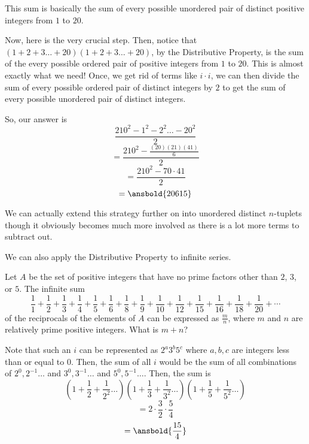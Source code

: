 \documentclass[11pt][mast]{lucky}
\begin{document}
\begin{sol}
This sum is basically the sum of every possible unordered pair of distinct positive integers from $1$ to $20$.

Now, here is the very crucial step. Then, notice that $(1+2+3\ldots + 20)(1+2+3\ldots + 20)$, by the Distributive Property, is the sum of the every possible ordered pair of positive integers from $1$ to $20$. This is almost exactly what we need! Once, we get rid of terms like $i\cdot i$, we can then divide the sum of every possible ordered pair of distinct integers by $2$ to get the sum of every possible unordered pair of distinct integers.

So, our answer is
$$\frac{210^2-1^2-2^2\ldots - 20^2}{2}$$
$$=\frac{210^2-\frac{(20)(21)(41)}{6}}{2}$$
$$=\frac{210^2-70\cdot 41}{2}$$
$$=\ansbold{20615}$$
\end{sol}

We can actually extend this strategy further on into unordered distinct $n$-tuplets though it obviously becomes much more involved as there is a lot more terms to subtract out.

We can also apply the Distributive Property to infinite series.

\begin{exam}[2018 AMC 12A/18]
Let $A$ be the set of positive integers that have no prime factors other than $2$, $3$, or $5$. The infinite sum $$\frac{1}{1} + \frac{1}{2} + \frac{1}{3} + \frac{1}{4} + \frac{1}{5} + \frac{1}{6} + \frac{1}{8} + \frac{1}{9} + \frac{1}{10} + \frac{1}{12} + \frac{1}{15} + \frac{1}{16} + \frac{1}{18} + \frac{1}{20} + \cdots$$of the reciprocals of the elements of $A$ can be expressed as $\frac{m}{n}$, where $m$ and $n$ are relatively prime positive integers. What is $m+n$?
\end{exam}

\begin{sol}
Note that such an $i$ can be represented as $2^{a}3^{b}5^{c}$ where $a,b,c$ are integers less than or equal to $0$. Then, the sum of all $i$ would be the sum of all combinations of $2^{0},2^{-1}\ldots$ and $3^{0},3^{-1}\ldots$ and $5^{0},5^{-1}\ldots $. Then, the sum is
$$(1+\frac{1}{2}+\frac{1}{2^2}\ldots)(1+\frac{1}{3}+\frac{1}{3^2}\ldots)(1+\frac{1}{5}+\frac{1}{5^2}\ldots)$$
$$=2\cdot \frac{3}{2}\cdot \frac{5}{4}$$
$$=\ansbold{\frac{15}{4}}$$
\end{sol}

\end{document}
